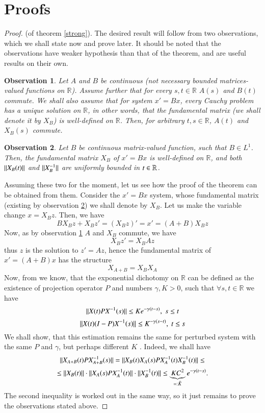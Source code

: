 \documentclass{elsarticle}
\newtheorem{observation}{Observation}
\theoremstyle{remark}
\begin{document}
\section{Proofs}
\begin{proof}{(of theorem \ref{strong}).\;}
The desired result will follow from two observations, which we shall state now and prove later. It should be noted that the observations have
weaker hypothesis than that of the theorem, and are useful results on their own.
\begin{observation}\label{Hard}Let $A$ and $B$ be continuous (not necessary bounded matrices-valued functions on $\mathbb{R}$). Assume further
that for every $s,t\in\mathbb{R}$ $A(s)$ and $B(t)$ commute. We shall also assume that for system $x'=Bx$, every Cauchy problem has a unique
solution on $\mathbb{R}$, in other words, that the fundamental matrix (we shall denote it by $X_B$) is well-defined on $\mathbb{R}$. Then,
for arbitrary $t,s\in\mathbb{R}$, $A(t)$ and $X_B(s)$ commute.
\end{observation}
\begin{observation}\label{Easy}Let $B$ be continuous matrix-valued function, such that $B\in L^1$. Then,
the fundamental matrix $X_B$ of $x'=Bx$ is well-defined on $\mathbb{R}$, and both $\|X_B(t)\|$ and $\|X^{-1}_B\|$ are uniformly bounded
in $t\in\mathbb{R}$.
\end{observation}
Assuming these two for the moment, let us see how the proof of the theorem can be obtained from them. Consider the $x'=Bx$ system, whose
fundamental matrix (existing by observation \ref{Easy}) we shall denote by $X_B$. Let us make the variable change $x=X_Bz$. Then, we have
\[BX_Bz+X_Bz'=(X_Bz)'=x'=(A+B)X_Bz\]
Now, as by observation \ref{Hard} $A$ and $X_B$ commute, we have
\[X_Bz'=X_BAz\]
thus $z$ is the solution to $z'=Az$, hence the fundamental matrix of $x'=(A+B)x$ has the structure
\[X_{A+B}=X_BX_A\]
Now, from \cite{coppel1978dichotomies} we know, that the exponential dichotomy on $\mathbb{R}$ can be defined as the existence of projection operator $P$
and numbers $\gamma,K>0$, such that $\forall s,t\in\mathbb{R}$ we have
\[\|X(t)PX^{-1}(s)\|\leq Ke^{-\gamma(t-s)},\;s\leq t\]
\[\|X(t)(I-P)X^{-1}(s)\|\leq K^{-\gamma(s-t)},\;t\leq s\]
We shall show, that this estimation remains the same for perturbed system  with the same $P$ and $\gamma$, but perhaps different $K$
. Indeed, we shall have
\[\|X_{A+B}(t)PX^{-1}_{A+B}(s)\|=\|X_B(t)X_A(s)PX^{-1}_A(t)X^{-1}_B(t)\|\leq\]
\[\leq\|X_B(t)\|\cdot\|X_A(s)PX^{-1}_A(t)\|\cdot\|X^{-1}_B(t)\|\leq \underbrace{KC^2}_{=:\tilde{K}}e^{-\gamma(t-s)}.\]
The second inequality is worked out in the same way, so it just remains to prove the observations stated above.
\end{proof}
\end{document}
